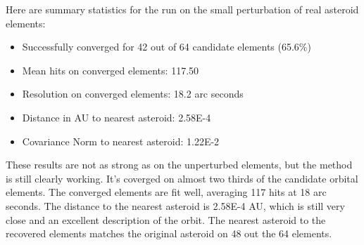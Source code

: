 Here are summary statistics for the run on the small perturbation of real asteroid elements:
\begin{itemize}
\item Successfully converged for 42 out of 64 candidate elements (65.6\%)
\item Mean hits on converged elements: 117.50
\item Resolution on converged elements: 18.2 arc seconds
\item Distance in AU to nearest asteroid: 2.58E-4
\item Covariance Norm to nearest asteroid: 1.22E-2
\end{itemize}
These results are not as strong as on the unperturbed elements, but the method is still clearly working.
It's coverged on almost two thirds of the candidate orbital elements.
The converged elements are fit well, averaging 117 hits at 18 arc seconds.
The distance to the nearest asteroid is 2.58E-4 AU, which is still very close and an excellent description of the orbit.
The nearest asteroid to the recovered elements matches the original asteroid on 48 out the 64 elements.

